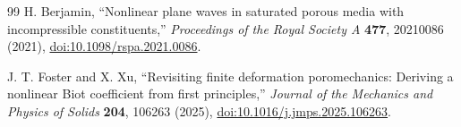 \documentclass[11pt]{article}
\begin{document}
\begin{thebibliography}{99}
H. Berjamin,
``Nonlinear plane waves in saturated porous media with incompressible
constituents,''
\emph{Proceedings of the Royal Society A} \textbf{477}, 20210086 (2021),
\href{https://doi.org/10.1098/rspa.2021.0086}{doi:10.1098/rspa.2021.0086}.

J. T. Foster and X. Xu,
``Revisiting finite deformation poromechanics: Deriving a nonlinear Biot
coefficient from first principles,''
\emph{Journal of the Mechanics and Physics of Solids} \textbf{204}, 106263
(2025),
\href{https://doi.org/10.1016/j.jmps.2025.106263}{doi:10.1016/j.jmps.2025.106263}.

\end{thebibliography}
\end{document}
